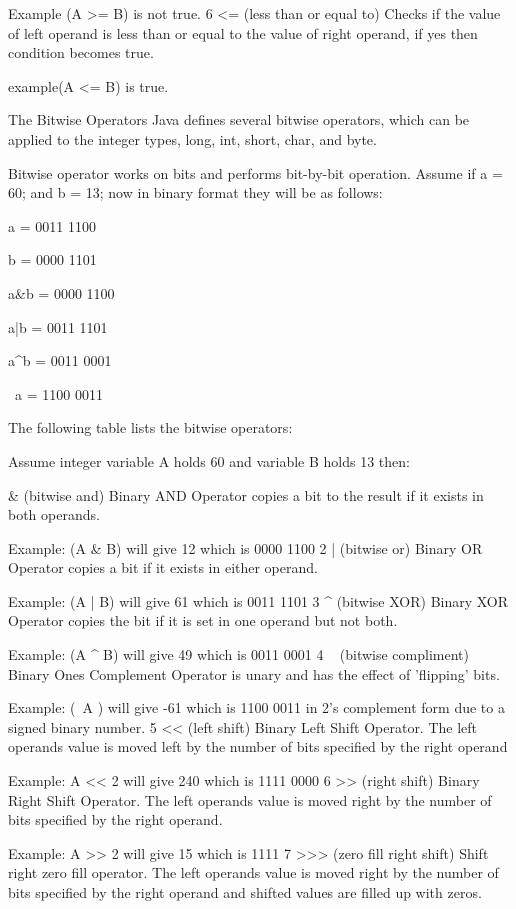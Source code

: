 Example (A >= B) is not true. 6 <= (less than or equal to) Checks if the value of left operand is less than or equal to the value of right operand, if yes then condition becomes true.

example(A <= B) is true.

The Bitwise Operators
Java defines several bitwise operators, which can be applied to the integer types, long, int, short, char, and byte.

Bitwise operator works on bits and performs bit-by-bit operation. Assume if a = 60; and b = 13; now in binary format they will be as follows:

a = 0011 1100

b = 0000 1101

a&b = 0000 1100

a|b = 0011 1101

a^b = 0011 0001

~a = 1100 0011

The following table lists the bitwise operators:

Assume integer variable A holds 60 and variable B holds 13 then:

& (bitwise and) Binary AND Operator copies a bit to the result if it exists in both operands.

Example: (A & B) will give 12 which is 0000 1100 2 | (bitwise or) Binary OR Operator copies a bit if it exists in either operand.

Example: (A | B) will give 61 which is 0011 1101 3 ^ (bitwise XOR) Binary XOR Operator copies the bit if it is set in one operand but not both.

Example: (A ^ B) will give 49 which is 0011 0001 4 ~ (bitwise compliment) Binary Ones Complement Operator is unary and has the effect of 'flipping' bits.

Example: (~A ) will give -61 which is 1100 0011 in 2's complement form due to a signed binary number. 5 << (left shift) Binary Left Shift Operator. The left operands value is moved left by the number of bits specified by the right operand

Example: A << 2 will give 240 which is 1111 0000 6 >> (right shift) Binary Right Shift Operator. The left operands value is moved right by the number of bits specified by the right operand.

Example: A >> 2 will give 15 which is 1111 7 >>> (zero fill right shift) Shift right zero fill operator. The left operands value is moved right by the number of bits specified by the right operand and shifted values are filled up with zeros.

